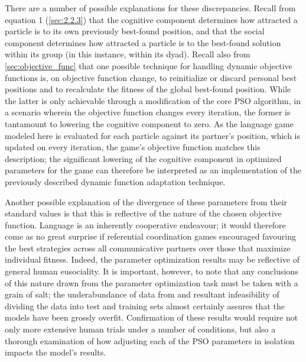 \documentclass[12pt,a4paper]{article}
\begin{document}
There are a number of possible explanations for these discrepancies. Recall from   
equation 1 (\ref{sec:2.2.3}) that the cognitive component determines how attracted a particle is to its own previously best-found position, and that the social component determines how attracted a particle is to the best-found solution within its group (in this instance, within its dyad). Recall also from \ref{sec:objective_func} that one possible technique for handling dynamic objective functions is, on objective function change, to reinitialize or discard personal best positions and to recalculate the fitness of the global best-found position. While the latter is only achievable through a modification of the core PSO algorithm, in a scenario wherein the objective function changes every iteration, the former is tantamount to lowering the cognitive component to zero. As the language game modeled here is evaluated for each particle against its partner's position, which is updated on every iteration, the game's objective function matches this description; the significant lowering of the cognitive component in optimized parameters for the game can therefore be interpreted as an implementation of the previously described dynamic function adaptation technique.

Another possible explanation of the divergence of these parameters from their standard values is that this is reflective of the nature of the chosen objective function. Language is an inherently cooperative endeavour; it would therefore come as no great surprise if referential coordination games encouraged favouring the best strategies across all communicative partners over those that maximize individual fitness. Indeed, the parameter optimization results may be reflective of general human eusociality. It is important, however, to note that any conclusions of this nature drawn from the parameter optimization task must be taken with a grain of salt; the underabundance of data from \citeauthor{rohde2012} and resultant infeasibility of dividing the data into test and training sets almost certainly assures that the models have been grossly overfit. Confirmation of these results would require not only more extensive human trials under a number of conditions, but also a thorough examination of how adjusting each of the PSO parameters in isolation impacts the model's results.
\end{document}

